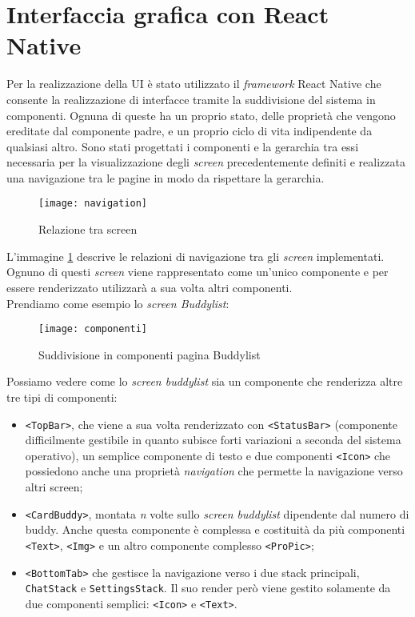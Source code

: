 \section{Interfaccia grafica con React Native}
Per la realizzazione della UI è stato utilizzato il \emph{framework} React Native che consente la realizzazione di interfacce tramite la suddivisione del sistema in componenti. Ognuna di queste ha un proprio stato, delle proprietà che vengono ereditate dal componente padre, e un proprio ciclo di vita indipendente da qualsiasi altro.
\newline
Sono stati progettati i componenti e la gerarchia tra essi necessaria per la visualizzazione degli \emph{screen} precedentemente definiti e realizzata una navigazione tra le pagine in modo da rispettare la gerarchia.
\begin{figure}[H] 
	\centering
	\texttt{[image: navigation]}
	\caption{Relazione tra screen}
	\label{gerarchiaRN}
\end{figure}
L'immagine \ref{gerarchiaRN} descrive le relazioni di navigazione tra gli \emph{screen} implementati. Ognuno di questi \emph{screen} viene rappresentato come un'unico componente e per essere renderizzato utilizzarà a sua volta altri componenti.\\
Prendiamo come esempio lo \emph{screen Buddylist}:
\begin{figure}[H] 
	\centering
	\texttt{[image: componenti]}
	\caption{Suddivisione in componenti pagina Buddylist}
\end{figure}
Possiamo vedere come lo \emph{screen buddylist} sia un componente che renderizza altre tre tipi di componenti: 
\begin{itemize}
	\item \texttt{<TopBar>}, che viene a sua volta renderizzato con \texttt{<StatusBar>} (componente difficilmente gestibile in quanto subisce forti variazioni a seconda del sistema operativo), un semplice componente di testo e due componenti \texttt{<Icon>} che possiedono anche una proprietà \emph{navigation} che permette la navigazione verso altri screen;
	\item \texttt{<CardBuddy>}, montata \emph{n} volte sullo \emph{screen buddylist} dipendente dal numero di buddy. Anche questa componente è complessa e costituità da più componenti \texttt{<Text>}, \texttt{<Img>} e un altro componente complesso \texttt{<ProPic>};
	\item \texttt{<BottomTab>} che gestisce la navigazione verso i due stack principali, \texttt{ChatStack} e \texttt{SettingsStack}. Il suo render però viene gestito solamente da due componenti semplici: \texttt{<Icon>} e \texttt{<Text>}.
\end{itemize}

